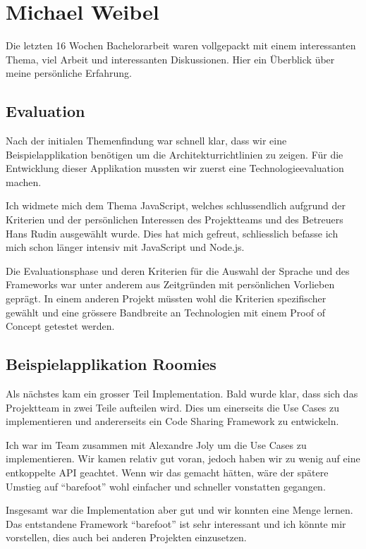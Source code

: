 \newpage
\section{Michael Weibel}

Die letzten 16 Wochen Bachelorarbeit waren vollgepackt mit einem interessanten Thema, viel Arbeit und interessanten Diskussionen. Hier ein Überblick über meine persönliche Erfahrung.

\subsection*{Evaluation}
Nach der initialen Themenfindung war schnell klar, dass wir eine Beispielapplikation benötigen um die Architekturrichtlinien zu zeigen. Für die Entwicklung dieser Applikation mussten wir zuerst eine Technologieevaluation machen.

Ich widmete mich dem Thema JavaScript, welches schlussendlich aufgrund der Kriterien und der persönlichen Interessen des Projektteams und des Betreuers Hans Rudin ausgewählt wurde. Dies hat mich gefreut, schliesslich befasse ich mich schon länger intensiv mit JavaScript und Node.js.

Die Evaluationsphase und deren Kriterien für die Auswahl der Sprache und des Frameworks war unter anderem aus Zeitgründen mit persönlichen Vorlieben geprägt. In einem anderen Projekt müssten wohl die Kriterien spezifischer gewählt und eine grössere Bandbreite an Technologien mit einem Proof of Concept getestet werden.

\subsection*{Beispielapplikation Roomies}
Als nächstes kam ein grosser Teil Implementation. Bald wurde klar, dass sich das Projektteam in zwei Teile aufteilen wird. Dies um einerseits die Use Cases zu implementieren und andererseits ein Code Sharing Framework zu entwickeln.

Ich war im Team zusammen mit Alexandre Joly um die Use Cases zu implementieren. Wir kamen relativ gut voran, jedoch haben wir zu wenig auf eine entkoppelte API geachtet. Wenn wir das gemacht hätten, wäre der spätere Umstieg auf ``barefoot'' wohl einfacher und schneller vonstatten gegangen.

Insgesamt war die Implementation aber gut und wir konnten eine Menge lernen. Das entstandene Framework ``barefoot'' ist sehr interessant und ich könnte mir vorstellen, dies auch bei anderen Projekten einzusetzen.

